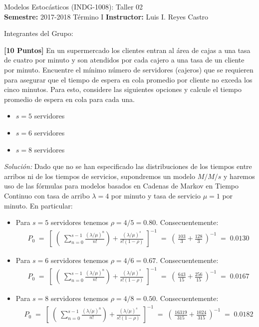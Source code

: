 \documentclass[ a4paper, twoside, 11pt]{article}
\newcommand{\numero}{02}
\begin{document}
\allowdisplaybreaks

\begin{center}
\Large Modelos Estoc\'asticos (INDG-1008): Taller \numero \\[1ex]
\small \textbf{Semestre:} 2017-2018 T\'ermino I \qquad
\textbf{Instructor:} Luis I. Reyes Castro
\end{center}
\halfskip

Integrantes del Grupo:
\fullskip
\fullskip

\begin{problem}
\textbf{[10 Puntos]} En un supermercado los clientes entran al \'area de cajas a una tasa de cuatro por minuto y son atendidos por cada cajero a una tasa de un cliente por minuto. Encuentre el m\'inimo n\'umero de servidores (\ie cajeros) que se requieren para asegurar que el tiempo de espera en cola promedio por cliente no exceda los cinco minutos. Para esto, considere las siguientes opciones y calcule el tiempo promedio de espera en cola para cada una. 
\begin{itemize}
\item $s = 5$ servidores
\item $s = 6$ servidores
\item $s = 8$ servidores
\end{itemize}

\emph{Soluci\'on:} Dado que no se han especificado las distribuciones de los tiempos entre arribos ni de los tiempos de servicios, supondremos un modelo $M/M/s$ y haremos uso de las f\'ormulas para modelos basados en Cadenas de Markov en Tiempo Continuo con tasa de arribo $\lambda = 4$ por minuto y tasa de servicio $\mu = 1$ por minuto. En particular: 
\begin{itemize}
\item Para $s = 5$ servidores tenemos $\rho = 4/5 = 0.80$. Consecuentemente: 
\begin{align*}
& P_0 \; = \;
\left[ \; \left( \;
\sum_{n=0}^{s-1} \frac{(\lambda/\mu)^n}{n!} \right)
+ \frac{(\lambda/\mu)^s}{s!(1-\rho)} \; \right]^{-1} \; = \; 
\left( \, \frac{103}{3} + \frac{128}{3} \, \right)^{-1} \; = \;
0.0130
\end{align*}
\item Para $s = 6$ servidores tenemos $\rho = 4/6 = 0.67$. Consecuentemente: 
\begin{align*}
& P_0 \; = \;
\left[ \; \left( \;
\sum_{n=0}^{s-1} \frac{(\lambda/\mu)^n}{n!} \right)
+ \frac{(\lambda/\mu)^s}{s!(1-\rho)} \; \right]^{-1} \; = \; 
\left( \, \frac{643}{15} + \frac{256}{15} \, \right)^{-1} \; = \;
0.0167
\end{align*}
\item Para $s = 8$ servidores tenemos $\rho = 4/8 = 0.50$. Consecuentemente: 
\begin{align*}
& P_0 \; = \;
\left[ \; \left( \;
\sum_{n=0}^{s-1} \frac{(\lambda/\mu)^n}{n!} \right)
+ \frac{(\lambda/\mu)^s}{s!(1-\rho)} \; \right]^{-1} \; = \; 
\left( \, \frac{16319}{315} + \frac{1024}{315} \, \right)^{-1} \; = \;
0.0182
\end{align*}

\end{itemize}


\end{problem}
\vspace{\baselineskip}
\end{document}
